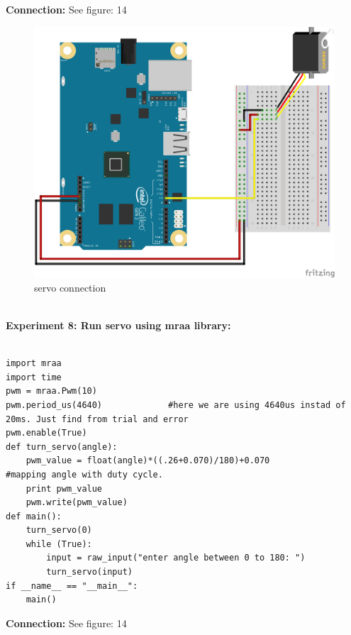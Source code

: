 \documentclass[11pt,a4paper]{article}
\begin{document}
\textbf{Connection:}
See figure: 14\\
\begin{figure}
	\includegraphics[width=\linewidth]{13.png}
    \caption{servo connection}
    \end{figure}
    \vspace{1cm}\\
        \textbf{\Large{Experiment 8: Run servo using mraa library:}}\\
    \vspace{.1cm}\\
   
\begin{lstlisting}
import mraa
import time
pwm = mraa.Pwm(10)			
pwm.period_us(4640)				#here we are using 4640us instad of 20ms. Just find from trial and error
pwm.enable(True)		
def turn_servo(angle):
    pwm_value = float(angle)*((.26+0.070)/180)+0.070 			#mapping angle with duty cycle.
	print pwm_value
    pwm.write(pwm_value)
def main():
	turn_servo(0)
    while (True):
        input = raw_input("enter angle between 0 to 180: ")
        turn_servo(input)
if __name__ == "__main__":
    main()

\end{lstlisting}

\textbf{Connection:}
See figure: 14
\newpage
\end{document}
